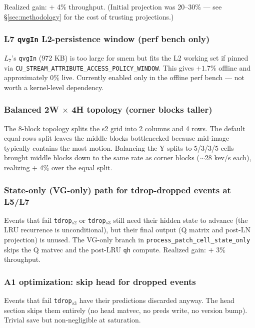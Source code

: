 \documentclass[11pt,a4paper]{article}
\begin{document}
Realized gain: \(+\) 4\% throughput. (Initial projection was 20--30\% ---
see \S \ref{sec:methodology} for the cost of trusting projections.)

\subsubsection*{L7 \texttt{qvgIn} L2-persistence window (perf bench only)}

\(L_7\)'s \texttt{qvgIn} (972 KB) is too large for smem but fits the L2
working set if pinned via
\texttt{CU\_STREAM\_ATTRIBUTE\_ACCESS\_POLICY\_WINDOW}. This gives
$+1.7$\% offline and approximately $0$\% live. Currently enabled only
in the offline perf bench --- not worth a kernel-level dependency.

\subsubsection*{Balanced 2W $\times$ 4H topology (corner blocks taller)}

The 8-block topology splits the s2 grid into 2 columns and 4 rows. The
default equal-rows split leaves the middle blocks bottlenecked because
mid-image typically contains the most motion. Balancing the Y splits to
5/3/3/5 cells brought middle blocks down to the same rate as corner
blocks ($\sim$28 kev/s each), realizing $+$ 4\% over the equal split.

\subsubsection*{State-only (VG-only) path for tdrop-dropped events at L5/L7}

Events that fail \texttt{tdrop\(_{s2}\)} or \texttt{tdrop\(_{s3}\)}
still need their hidden state to advance (the LRU recurrence is
unconditional), but their final output (Q matrix and post-LN
projection) is unused. The VG-only branch in
\texttt{process\_patch\_cell\_state\_only} skips the Q matvec and the
post-LRU \texttt{qh} compute. Realized gain: $+$ 3\% throughput.

\subsubsection*{A1 optimization: skip head for dropped events}

Events that fail \texttt{tdrop\(_{s3}\)} have their predictions
discarded anyway. The head section skips them entirely (no head
matvec, no preds write, no version bump). Trivial save but
non-negligible at saturation.
\end{document}
